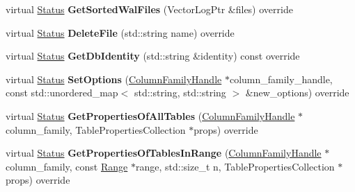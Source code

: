 \begin{DoxyCompactItemize}
\item 
virtual \hyperlink{classrocksdb_1_1Status}{Status} {\bfseries Get\+Sorted\+Wal\+Files} (Vector\+Log\+Ptr \&files) override\hypertarget{classrocksdb_1_1StackableDB_af9dc989dd2a6cb12fd319385903b1227}{}\label{classrocksdb_1_1StackableDB_af9dc989dd2a6cb12fd319385903b1227}

\item 
virtual \hyperlink{classrocksdb_1_1Status}{Status} {\bfseries Delete\+File} (std\+::string name) override\hypertarget{classrocksdb_1_1StackableDB_a4398ffdf9f1e5ed783715b2d7f1ca099}{}\label{classrocksdb_1_1StackableDB_a4398ffdf9f1e5ed783715b2d7f1ca099}

\item 
virtual \hyperlink{classrocksdb_1_1Status}{Status} {\bfseries Get\+Db\+Identity} (std\+::string \&identity) const override\hypertarget{classrocksdb_1_1StackableDB_ad62f92ebfa906098764f46c3cf238b66}{}\label{classrocksdb_1_1StackableDB_ad62f92ebfa906098764f46c3cf238b66}

\item 
virtual \hyperlink{classrocksdb_1_1Status}{Status} {\bfseries Set\+Options} (\hyperlink{classrocksdb_1_1ColumnFamilyHandle}{Column\+Family\+Handle} $\ast$column\+\_\+family\+\_\+handle, const std\+::unordered\+\_\+map$<$ std\+::string, std\+::string $>$ \&new\+\_\+options) override\hypertarget{classrocksdb_1_1StackableDB_acd22ab959b40739f75f2c690cd2af4b5}{}\label{classrocksdb_1_1StackableDB_acd22ab959b40739f75f2c690cd2af4b5}

\item 
virtual \hyperlink{classrocksdb_1_1Status}{Status} {\bfseries Get\+Properties\+Of\+All\+Tables} (\hyperlink{classrocksdb_1_1ColumnFamilyHandle}{Column\+Family\+Handle} $\ast$column\+\_\+family, Table\+Properties\+Collection $\ast$props) override\hypertarget{classrocksdb_1_1StackableDB_afacaa11e5fa404b7962201170c32f9a7}{}\label{classrocksdb_1_1StackableDB_afacaa11e5fa404b7962201170c32f9a7}

\item 
virtual \hyperlink{classrocksdb_1_1Status}{Status} {\bfseries Get\+Properties\+Of\+Tables\+In\+Range} (\hyperlink{classrocksdb_1_1ColumnFamilyHandle}{Column\+Family\+Handle} $\ast$column\+\_\+family, const \hyperlink{structrocksdb_1_1Range}{Range} $\ast$range, std\+::size\+\_\+t n, Table\+Properties\+Collection $\ast$props) override\hypertarget{classrocksdb_1_1StackableDB_ac064acc45bf9e8a7d27a242e6df04791}{}\label{classrocksdb_1_1StackableDB_ac064acc45bf9e8a7d27a242e6df04791}


\end{DoxyCompactItemize}
